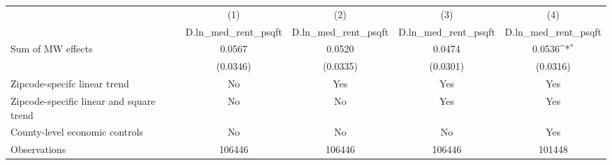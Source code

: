 {
\def\sym#1{\ifmmode^{#1}\else\(^{#1}\)\fi}
\begin{tabular}{l*{4}{c}}
\hline\hline
          &\multicolumn{1}{c}{(1)}&\multicolumn{1}{c}{(2)}&\multicolumn{1}{c}{(3)}&\multicolumn{1}{c}{(4)}\\
          &\multicolumn{1}{c}{D.ln\_med\_rent\_psqft}&\multicolumn{1}{c}{D.ln\_med\_rent\_psqft}&\multicolumn{1}{c}{D.ln\_med\_rent\_psqft}&\multicolumn{1}{c}{D.ln\_med\_rent\_psqft}\\
\hline
Sum of MW effects&   0.0567         &   0.0520         &   0.0474         &   0.0536\sym{*}  \\
          & (0.0346)         & (0.0335)         & (0.0301)         & (0.0316)         \\
\hline
Zipcode-specifc linear trend&       No         &      Yes         &      Yes         &      Yes         \\
Zipcode-specific linear and square trend&       No         &       No         &      Yes         &      Yes         \\
County-level economic controls&       No         &       No         &       No         &      Yes         \\
Observations&   106446         &   106446         &   106446         &   101448         \\
\hline\hline
\end{tabular}
}
